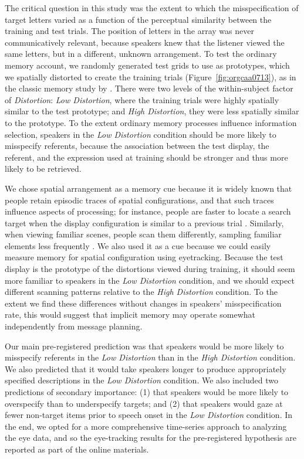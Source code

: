 \documentclass[natbib,man,a4paper]{apa6}
\begin{document}
The critical question in this study was the extent to which the misspecification of target letters varied as a function of the perceptual similarity between the training and test trials. The position of letters in the array was never communicatively relevant, because speakers knew that the listener viewed the same letters, but in a different, unknown arrangement. To test the ordinary memory account, we randomly generated test grids to use as prototypes, which we spatially distorted to create the training trials (Figure~\ref{fig:orgcaa0713}), as in the classic memory study by \cite{posner_keele_1968}. There were two levels of the within-subject factor of \emph{Distortion}: \emph{Low Distortion}, where the training trials were highly spatially similar to the test prototype; and \emph{High Distortion}, they were less spatially similar to the prototype. To the extent ordinary memory processes influence information selection, speakers in the \emph{Low Distortion} condition should be more likely to misspecify referents, because the association between the test display, the referent, and the expression used at training should be stronger and thus more likely to be retrieved.

We chose spatial arrangement as a memory cue because it is widely known that people retain episodic traces of spatial configurations, and that such traces influence aspects of processing; for instance, people are faster to locate a search target when the display configuration is similar to a previous trial \citep{chun_jiang_1998}.  Similarly, when viewing familiar scenes, people scan them differently, sampling familiar elements less frequently \citep{ryan2000amnesia}.  We also used it as a cue because we could easily measure memory for spatial configuration using eyetracking. Because the test display is the prototype of the distortions viewed during training, it should seem more familiar to speakers in the \emph{Low Distortion} condition, and we should expect different scanning patterns relative to the \emph{High Distortion} condition. To the extent we find these differences without changes in speakers' misspecification rate, this would suggest that implicit memory may operate somewhat independently from message planning.

Our main pre-registered prediction was that speakers would be more likely to misspecify referents in the \emph{Low Distortion} than in the \emph{High Distortion} condition. We also predicted that it would take speakers longer to produce appropriately specified descriptions in the \emph{Low Distortion} condition. We also included two predictions of secondary importance: (1) that speakers would be more likely to overspecify than to underspecify targets; and (2) that speakers would gaze at fewer non-target items prior to speech onset in the \emph{Low Distortion} condition. In the end, we opted for a more comprehensive time-series approach to analyzing the eye data, and so the eye-tracking results for the pre-registered hypothesis are reported as part of the online materials.
\end{document}
